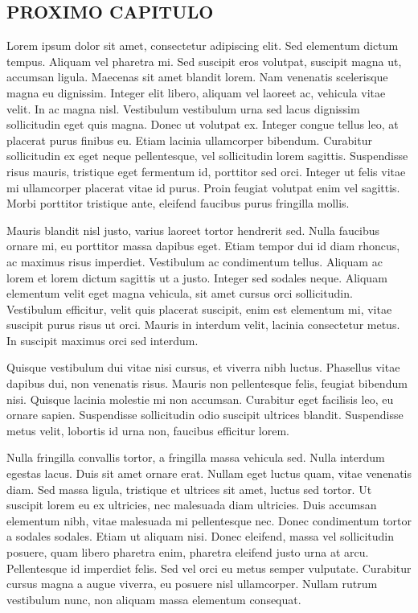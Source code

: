 \documentclass[article,12pt,oneside,a4paper,english,brazil]{unifil}
\begin{document}
\begin{Spacing}{1.5}
\section*{PROXIMO CAPITULO}

Lorem ipsum dolor sit amet, consectetur adipiscing elit. Sed elementum dictum tempus. Aliquam vel pharetra mi. Sed suscipit eros volutpat, suscipit magna ut, accumsan ligula. Maecenas sit amet blandit lorem. Nam venenatis scelerisque magna eu dignissim. Integer elit libero, aliquam vel laoreet ac, vehicula vitae velit. In ac magna nisl. Vestibulum vestibulum urna sed lacus dignissim sollicitudin eget quis magna. Donec ut volutpat ex. Integer congue tellus leo, at placerat purus finibus eu. Etiam lacinia ullamcorper bibendum. Curabitur sollicitudin ex eget neque pellentesque, vel sollicitudin lorem sagittis. Suspendisse risus mauris, tristique eget fermentum id, porttitor sed orci. Integer ut felis vitae mi ullamcorper placerat vitae id purus. Proin feugiat volutpat enim vel sagittis. Morbi porttitor tristique ante, eleifend faucibus purus fringilla mollis.

Mauris blandit nisl justo, varius laoreet tortor hendrerit sed. Nulla faucibus ornare mi, eu porttitor massa dapibus eget. Etiam tempor dui id diam rhoncus, ac maximus risus imperdiet. Vestibulum ac condimentum tellus. Aliquam ac lorem et lorem dictum sagittis ut a justo. Integer sed sodales neque. Aliquam elementum velit eget magna vehicula, sit amet cursus orci sollicitudin. Vestibulum efficitur, velit quis placerat suscipit, enim est elementum mi, vitae suscipit purus risus ut orci. Mauris in interdum velit, lacinia consectetur metus. In suscipit maximus orci sed interdum.

Quisque vestibulum dui vitae nisi cursus, et viverra nibh luctus. Phasellus vitae dapibus dui, non venenatis risus. Mauris non pellentesque felis, feugiat bibendum nisi. Quisque lacinia molestie mi non accumsan. Curabitur eget facilisis leo, eu ornare sapien. Suspendisse sollicitudin odio suscipit ultrices blandit. Suspendisse metus velit, lobortis id urna non, faucibus efficitur lorem.

Nulla fringilla convallis tortor, a fringilla massa vehicula sed. Nulla interdum egestas lacus. Duis sit amet ornare erat. Nullam eget luctus quam, vitae venenatis diam. Sed massa ligula, tristique et ultrices sit amet, luctus sed tortor. Ut suscipit lorem eu ex ultricies, nec malesuada diam ultricies. Duis accumsan elementum nibh, vitae malesuada mi pellentesque nec. Donec condimentum tortor a sodales sodales. Etiam ut aliquam nisi. Donec eleifend, massa vel sollicitudin posuere, quam libero pharetra enim, pharetra eleifend justo urna at arcu. Pellentesque id imperdiet felis. Sed vel orci eu metus semper vulputate. Curabitur cursus magna a augue viverra, eu posuere nisl ullamcorper. Nullam rutrum vestibulum nunc, non aliquam massa elementum consequat.


\end{Spacing}
\end{document}
